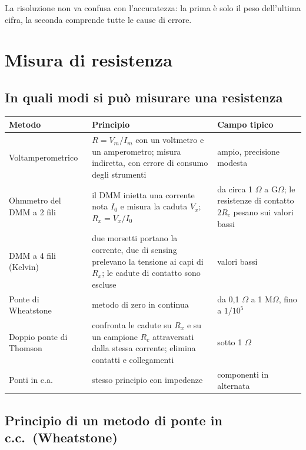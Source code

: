 \documentclass[11pt,a4paper]{article}
\begin{document}
La risoluzione non va confusa con l'accuratezza: la prima è solo il peso dell'ultima cifra, la seconda comprende tutte le cause di errore.

\section*{Misura di resistenza}

\subsection*{In quali modi si può misurare una resistenza}

\begin{center}
\begin{tabularx}{\linewidth}{>{\raggedright\arraybackslash}p{3.0cm} L >{\raggedright\arraybackslash}p{3.6cm}}
\toprule
\textbf{Metodo} & \textbf{Principio} & \textbf{Campo tipico}\\
\midrule
Voltamperometrico & $R = V_m/I_m$ con un voltmetro e un amperometro; misura indiretta, con errore di consumo degli strumenti & ampio, precisione modesta\\
Ohmmetro del DMM a 2 fili & il DMM inietta una corrente nota $I_0$ e misura la caduta $V_x$; $R_x = V_x/I_0$ & da circa 1 $\Omega$ a G$\Omega$; le resistenze di contatto $2R_c$ pesano sui valori bassi\\
DMM a 4 fili (Kelvin) & due morsetti portano la corrente, due di sensing prelevano la tensione ai capi di $R_x$; le cadute di contatto sono escluse & valori bassi\\
Ponte di Wheatstone & metodo di zero in continua & da 0,1 $\Omega$ a 1 M$\Omega$, fino a $1/10^5$\\
Doppio ponte di Thomson & confronta le cadute su $R_x$ e su un campione $R_c$ attraversati dalla stessa corrente; elimina contatti e collegamenti & sotto 1 $\Omega$\\
Ponti in c.a. & stesso principio con impedenze & componenti in alternata\\
\bottomrule
\end{tabularx}
\end{center}

\subsection*{Principio di un metodo di ponte in c.c.\ (Wheatstone)}
\end{document}
